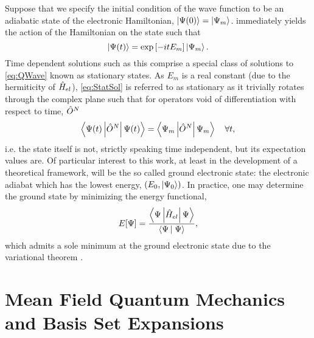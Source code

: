 Suppose that we specify the initial condition of the wave function to be an adiabatic state
of the electronic Hamiltonian, $\left\vert \Psi(0) \right\rangle = \left\vert \Psi_m \right\rangle$.  immediately 
yields the action of the Hamiltonian on the state such that
\begin{equation}
\label{eq:StatSol}
\left\vert \Psi(t) \right\rangle = \exp \left[ -it E_m \right] \left\vert \Psi_m \right\rangle. 
\end{equation}
Time dependent solutions such as this comprise a special class of solutions to \cref{eq:QWave} 
known as stationary states. As $E_m$ is a real constant (due to the hermiticity of $\hat{H}_{el}$),
\cref{eq:StatSol} is referred to as stationary as it trivially rotates through the complex plane
such that for operators void of differentiation with respect to time, $\hat{O}^N$
\begin{equation}
\left\langle \Psi(t) \left\vert \hat{O}^N \right\vert \Psi(t) \right\rangle = \left\langle \Psi_m \left\vert \hat{O}^N \right\vert \Psi_m \right\rangle \quad \forall t,
\end{equation}
i.e. the state itself is not, strictly speaking time independent, but its expectation values are.
Of particular interest to this work, at least in the development of a theoretical framework, will be 
the so called ground electronic state: the electronic adiabat which has the lowest energy, $(E_0,\left\vert \Psi_0 \right\rangle)$.
In practice, one may determine the ground state by minimizing the energy functional,
\begin{equation}
\label{eq:EnergyFunctional}
E[\Psi] = \frac{\left\langle \Psi \left\vert \hat{H}_{el} \right\vert \Psi \right\rangle}{\left\langle \Psi \left\vert\right. \Psi \right\rangle},
\end{equation}
which admits a sole minimum at the ground electronic state due to the variational theorem .

\section{Mean Field Quantum Mechanics and Basis Set Expansions}

